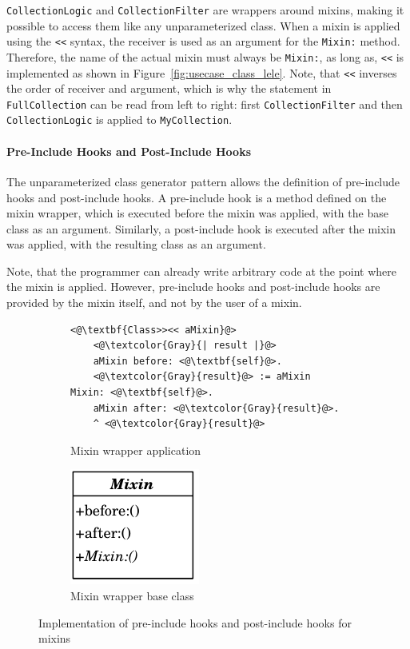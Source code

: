 \texttt{CollectionLogic} and \texttt{CollectionFilter} are wrappers around mixins, making it possible to access them like any unparameterized class. When a mixin is applied using the \texttt{<<} syntax, the receiver is used as an argument for the \texttt{Mixin:} method. Therefore, the name of the actual mixin must always be \texttt{Mixin:}, as long as, \texttt{<<} is implemented as shown in Figure~\ref{fig:usecase_class_lele}. Note, that \texttt{<<} inverses the order of receiver and argument, which is why the statement in \texttt{FullCollection} can be read from left to right: first \texttt{CollectionFilter} and then \texttt{CollectionLogic} is applied to \texttt{MyCollection}.

\paragraph{Pre-Include Hooks and Post-Include Hooks}
The unparameterized class generator pattern allows the definition of pre-include hooks and post-include hooks. A pre-include hook is a method defined on the mixin wrapper, which is executed before the mixin was applied, with the base class as an argument. Similarly, a post-include hook is executed after the mixin was applied, with the resulting class as an argument. 

Note, that the programmer can already write arbitrary code at the point where the mixin is applied. However, pre-include hooks and post-include hooks are provided by the mixin itself, and not by the user of a mixin.

\begin{figure}[!htp]
\centering
\begin{subfigure}[b]{0.45\textwidth}
\begin{lstlisting}
<@\textbf{Class>><< aMixin}@>
    <@\textcolor{Gray}{| result |}@>
    aMixin before: <@\textbf{self}@>.
    <@\textcolor{Gray}{result}@> := aMixin Mixin: <@\textbf{self}@>.
    aMixin after: <@\textcolor{Gray}{result}@>.
    ^ <@\textcolor{Gray}{result}@>
\end{lstlisting}
\caption{Mixin wrapper application}
\end{subfigure}
\qquad
\begin{subfigure}[b]{0.45\textwidth}
	\centering
	\includegraphics[scale=1]{abstract_mixin_classgen.pdf}
	\caption{Mixin wrapper base class}
\end{subfigure}
\caption[Implementation of mixin include hooks]{Implementation of pre-include hooks and post-include hooks for mixins}
\label{fig:usecase_prepostincl}
\end{figure}


